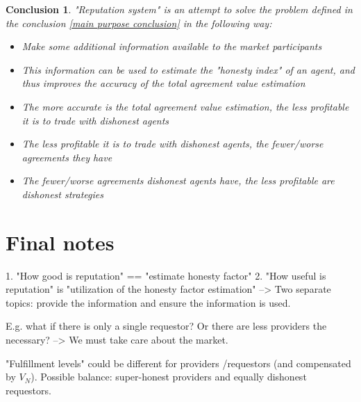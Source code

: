 \documentclass{article}
\newtheorem{conclusion}{Conclusion}[section]
\begin{document}
\begin{conclusion}

"Reputation system" is an attempt to solve the problem defined in the conclusion \ref{main purpose conclusion} in the following way:

\begin{itemize}
    \item{Make some additional information available to the market participants}
    \item{This information can be used to estimate the "honesty index" of an agent, and thus improves the accuracy of the total agreement value estimation}
    \item{The more accurate is the total agreement value estimation, the less profitable it is to trade with dishonest agents}
    \item{The less profitable it is to trade with dishonest agents, the fewer/worse agreements they have}
    \item{The fewer/worse agreements dishonest agents have, the less profitable are dishonest strategies}
\end{itemize}

\end{conclusion}


\section{Final notes}

1. "How good is reputation" == "estimate honesty factor"
2. "How useful is reputation" is "utilization of the honesty factor estimation"
--> Two separate topics: provide the information and ensure the information is used.

E.g. what if there is only a single requestor? Or there are less providers the necessary?
--> We must take care about the market.

"Fulfillment levels" could be different for providers /requestors (and compensated by $V_N$).
Possible balance: super-honest providers and equally dishonest requestors.
\end{document}
